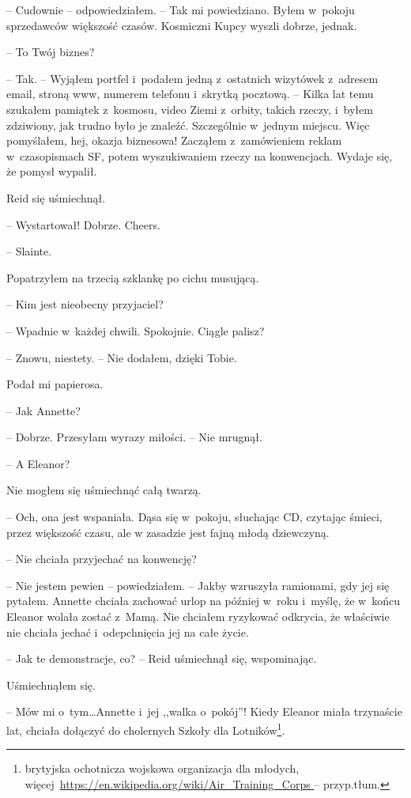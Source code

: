 \documentclass[oneside,polish,11pt,sfheadings]{mwbk}
\begin{document}
-- Cudownie -- odpowiedziałem. -- Tak mi powiedziano. Byłem w~pokoju
sprzedawców większość czasów. Kosmiczni Kupcy wyszli dobrze, jednak.

-- To Twój biznes?

-- Tak. -- Wyjąłem portfel i~podałem jedną z~ostatnich wizytówek z~adresem
email, stroną www, numerem telefonu i~skrytką pocztową. -- Kilka lat temu
szukałem pamiątek z~kosmosu, video Ziemi z~orbity, takich rzeczy, i~byłem zdziwiony, jak trudno było je znaleźć. Szczególnie w~jednym
miejscu. Więc pomyślałem, hej, okazja biznesowa! Zacząłem z~zamówieniem
reklam w~czasopismach SF, potem wyszukiwaniem rzeczy na konwencjach.
Wydaje się, że pomysł wypalił.

Reid się uśmiechnął. 

-- Wystartował! Dobrze. Cheers.

-- Slainte.

Popatrzyłem na trzecią szklankę po cichu musującą.

-- Kim jest nieobecny przyjaciel?

-- Wpadnie w~każdej chwili. Spokojnie. Ciągle palisz?

-- Znowu, niestety. -- Nie dodałem, dzięki Tobie.

Podał mi papierosa.

-- Jak Annette?

-- Dobrze. Przesyłam wyrazy miłości. -- Nie mrugnął.

-- A Eleanor?

Nie mogłem się uśmiechnąć całą twarzą. 

-- Och, ona jest wspaniała. Dąsa
się w~pokoju, słuchając CD, czytając śmieci, przez większość czasu, ale
w zasadzie jest fajną młodą dziewczyną.

-- Nie chciała przyjechać na konwencję?

-- Nie jestem pewien -- powiedziałem. -- Jakby wzruszyła ramionami, gdy jej
się pytałem. Annette chciała zachować urlop na później w~roku i~myślę,
że w~końcu Eleanor wolała zostać z~Mamą. Nie chciałem ryzykować
odkrycia, że właściwie nie chciała jechać i~odepchnięcia jej na całe
życie.

-- Jak te demonstracje, co? -- Reid uśmiechnął się, wspominając.

Uśmiechnąłem się. 

-- Mów mi o~tym\ldots Annette i~jej ,,walka o~pokój''!
Kiedy Eleanor miała trzynaście lat, chciała dołączyć do cholernych
Szkoły dla Lotników\footnote{brytyjska ochotnicza wojskowa organizacja dla
młodych,
więcej~\url{https://en.wikipedia.org/wiki/Air_Training_Corps
} -- przyp.tłum.}.
\end{document}
